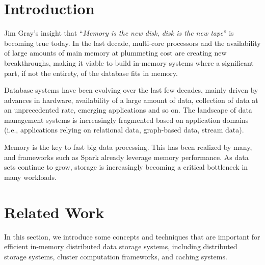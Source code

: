 \documentclass[twocolumn]{article}
\newcommand*\DNA{\textsc{dna}}
\newcommand*\Let[2]{\State #1 $\gets$ #2}
\begin{document}

\section{Introduction}
Jim Gray's insight that ``\textit{Memory is the new disk, disk is the new tape}'' is becoming true today. 
In the last decade, multi-core processors and the availability of large amounts of main memory at
plummeting cost are creating new breakthroughs, making it viable to
build in-memory systems where a significant part, if not the entirety,
of the database fits in memory.%

Database systems have been evolving over the last few decades, mainly
driven by advances in hardware, availability of a large amount of data,
collection of data at an unprecedented rate, emerging applications and
so on. The landscape of data management systems is increasingly
fragmented based on application domains (i.e., applications relying on
relational data, graph-based data, stream data).

Memory is the key to fast big data processing. This has been realized by many, and frameworks such as Spark already leverage memory performance. As data sets continue to grow, storage is increasingly becoming a critical bottleneck in many workloads.

\section{Related Work}
In this section, we introduce some concepts and techniques that are important for efficient in-memory distributed data storage systems, including distributed storage systems, cluster computation frameworks, and caching systems.
\end{document}
